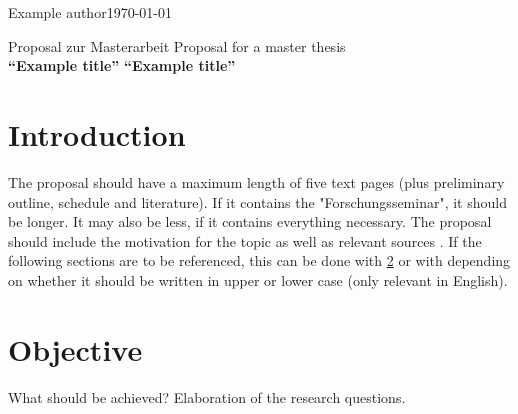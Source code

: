 \documentclass[a4paper, 11pt]{article}
\newcommand{\Titel}{Example title} %
\newcommand{\Author}{Example author} %
\begin{document}
\Author \hfill \today\\
\newline
%
\begin{center}
		{\large{Proposal zur Masterarbeit}}
		{\large{Proposal for a master thesis}} \\
  	\vspace*{0.5cm}
  		{\Large{\bf "`\Titel{}"'}}
  		{\Large{\bf ``\Titel{}''}}
\end{center}
%
\setlength{\parskip}{1.5ex plus0.5ex minus 0.5ex}

\section{Introduction}%
\label{introduction}
The proposal should have a maximum length of five text pages (plus preliminary outline, schedule and literature). If it contains the "Forschungsseminar", it should be longer. It may also be less, if it contains everything necessary.
The proposal should include the motivation for the topic as well as relevant sources \cite{Crastan2008}.
If the following sections are to be referenced, this can be done with \cref{objective} or with  depending on whether it should be written in upper or lower case (only relevant in English).


\section{Objective}
\label{objective}
What should be achieved? Elaboration of the research questions. 

\end{document}
